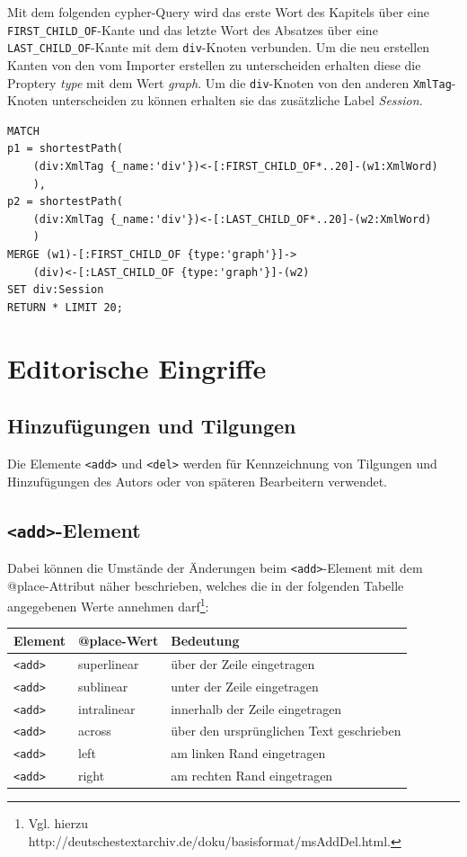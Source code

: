 \documentclass[ngerman,]{scrreprt}
\begin{document}
Mit dem folgenden cypher-Query wird das erste Wort des Kapitels über eine \texttt{FIRST\_CHILD\_OF}-Kante und das letzte Wort des Absatzes über eine \texttt{LAST\_CHILD\_OF}-Kante mit dem \texttt{div}-Knoten verbunden. Um die neu erstellen Kanten von den vom Importer erstellen zu unterscheiden erhalten diese die Proptery \emph{type} mit dem Wert \emph{graph}. Um die \texttt{div}-Knoten von den anderen \texttt{XmlTag}-Knoten unterscheiden zu können erhalten sie das zusätzliche Label \emph{Session}.

\begin{verbatim}
MATCH
p1 = shortestPath(
    (div:XmlTag {_name:'div'})<-[:FIRST_CHILD_OF*..20]-(w1:XmlWord)
    ),
p2 = shortestPath(
    (div:XmlTag {_name:'div'})<-[:LAST_CHILD_OF*..20]-(w2:XmlWord)
    )
MERGE (w1)-[:FIRST_CHILD_OF {type:'graph'}]->
    (div)<-[:LAST_CHILD_OF {type:'graph'}]-(w2)
SET div:Session
RETURN * LIMIT 20;
\end{verbatim}

\section{Editorische Eingriffe}\label{editorische-eingriffe}

\subsection{Hinzufügungen und Tilgungen}\label{hinzufuxfcgungen-und-tilgungen}

Die Elemente \texttt{\textless{}add\textgreater{}} und \texttt{\textless{}del\textgreater{}} werden für Kennzeichnung von Tilgungen und Hinzufügungen des Autors oder von späteren Bearbeitern verwendet.

\subsection{\texorpdfstring{\texttt{\textless{}add\textgreater{}}-Element}{\textless{}add\textgreater{}-Element}}\label{add-element}

Dabei können die Umstände der Änderungen beim \texttt{\textless{}add\textgreater{}}-Element mit dem @place-Attribut näher beschrieben, welches die in der folgenden Tabelle angegebenen Werte annehmen darf\footnote{Vgl. hierzu http://deutschestextarchiv.de/doku/basisformat/msAddDel.html.}:

\begin{longtable}[]{@{}lll@{}}
\toprule
Element & @place-Wert & Bedeutung\tabularnewline
\midrule
\endhead
\texttt{\textless{}add\textgreater{}} & superlinear & über der Zeile eingetragen\tabularnewline
\texttt{\textless{}add\textgreater{}} & sublinear & unter der Zeile eingetragen\tabularnewline
\texttt{\textless{}add\textgreater{}} & intralinear & innerhalb der Zeile eingetragen\tabularnewline
\texttt{\textless{}add\textgreater{}} & across & über den ursprünglichen Text geschrieben\tabularnewline
\texttt{\textless{}add\textgreater{}} & left & am linken Rand eingetragen\tabularnewline
\texttt{\textless{}add\textgreater{}} & right & am rechten Rand eingetragen\tabularnewline
\bottomrule
\end{longtable}
\end{document}
